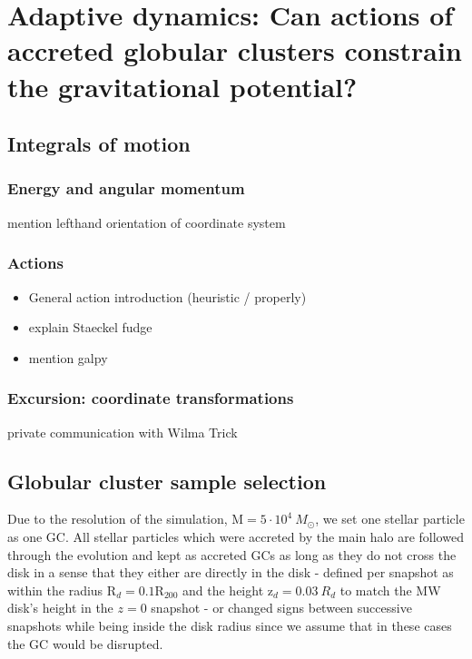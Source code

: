 \section{Adaptive dynamics: Can actions of accreted globular clusters constrain the gravitational potential?}\label{sec:Dynamics}
\subsection{Integrals of motion}

\subsubsection{Energy and angular momentum}
mention lefthand orientation of coordinate system
\subsubsection{Actions}
\begin{itemize}
    \item General action introduction (heuristic / properly)
    \item explain Staeckel fudge
    \item mention galpy
    
\end{itemize}

\subsubsection{Excursion: coordinate transformations}
private communication with Wilma Trick

\subsection{Globular cluster sample selection}\label{subsec:GC_selection}
Due to the resolution of the simulation, $\mathrm{M} = 5 \cdot 10 ^ 4\ M_{\odot}$, we set one stellar particle as one \ac{GC}. All stellar particles which were accreted by the main halo are followed through the evolution and kept as accreted \acp{GC} as long as they do not cross the disk in a sense that they either are directly in the disk - defined per snapshot as within the radius $\mathrm{R}_d = 0.1  \mathrm{R}_{200}$ and the height $\mathrm{z}_d = 0.03\ R_d$ to match the \ac{MW} disk's height in the $z = 0$ snapshot - or changed signs between successive snapshots while being inside the disk radius since we assume that in these cases the \ac{GC} would be disrupted. 

